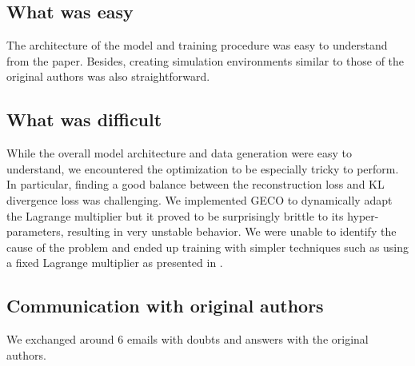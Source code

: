 \subsection*{What was easy}
The architecture of the model and training procedure was easy to understand from the paper.
Besides, creating simulation environments similar to those of the original authors was also straightforward. 

\subsection*{What was difficult}
While the overall model architecture and data generation were easy to understand, we encountered the optimization to be especially tricky to perform.
In particular, finding a good balance between the reconstruction loss and KL divergence loss was challenging.
We implemented GECO \cite{geco} to dynamically adapt the Lagrange multiplier but it proved to be surprisingly brittle to its hyper-parameters, resulting in very unstable behavior.
We were unable to identify the cause of the problem and ended up training with simpler techniques such as using a fixed Lagrange multiplier as presented in \cite{beta-vae}.

\subsection*{Communication with original authors}
We exchanged around 6 emails with doubts and answers with the original authors.


\newpage









